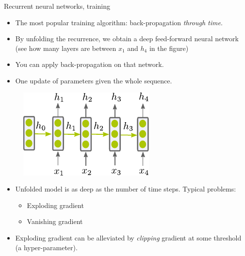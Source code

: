 \begin{frame}{Recurrent neural networks, training}
\begin{itemize}
\item The most popular training algorithm: back-propagation \textit{through time}.
\item By unfolding the recurrence, we obtain a deep feed-forward neural network (see how many layers
are between $x_1$ and $h_4$ in the figure)
\item You can apply back-propagation on that network.
\item One update of parameters given the whole sequence.
\end{itemize}
\begin{figure}
\centering
\includegraphics[width=.3\linewidth]{./figures/rnn.pdf}
\end{figure}
\vsp
\begin{itemize}
\item Unfolded model is as deep as the number of time steps. Typical problems:
\begin{itemize}
\item Exploding gradient
\item Vanishing gradient
\end{itemize}
\item Exploding gradient can be alleviated by \textit{clipping} gradient at some threshold (a hyper-parameter).
\end{itemize}

\end{frame}

